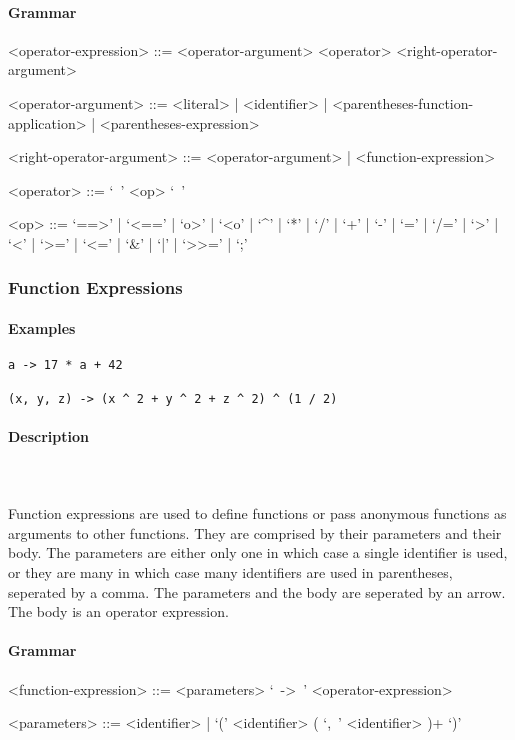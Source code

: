 \documentclass{article}
\def\pend{\mbox{} \\\\}
\begin{document}
\paragraph{Grammar}
\begin{grammar}
<operator-expression> ::= <operator-argument> <operator> <right-operator-argument>

<operator-argument> ::=
<literal> | <identifier> | <parentheses-function-application> |
<parentheses-expression>

<right-operator-argument> ::= <operator-argument> | <function-expression>

<operator> ::= `\ ' <op> `\ '

<op> ::= 
`==>' | `<==' | `o>' | `<o' | `^' | `*' | `/' | `+' | `-' |
`=' | `/=' | `>' | `<' | `>=' | `<=' | `\&' | `|' | `>>=' | `;'
\end{grammar}

\subsubsection{Function Expressions}

\paragraph{Examples}

\begin{verbatim}
a -> 17 * a + 42

(x, y, z) -> (x ^ 2 + y ^ 2 + z ^ 2) ^ (1 / 2)
\end{verbatim}

\paragraph{Description}\pend
Function expressions are used to define functions or pass anonymous functions as 
arguments to other functions. They are comprised by their parameters and their 
body. The parameters are either only one in which case a single identifier is used, 
or they are many in which case many identifiers are used in parentheses, seperated 
by a comma. The parameters and the body are seperated by an arrow.
The body is an operator expression.

\paragraph{Grammar}
\begin{grammar}
<function-expression> ::= <parameters> `\ ->\ ' <operator-expression>

<parameters> ::= <identifier> | `(' <identifier> ( `,\ ' <identifier> )+ `)'
\end{grammar}
\end{document}
